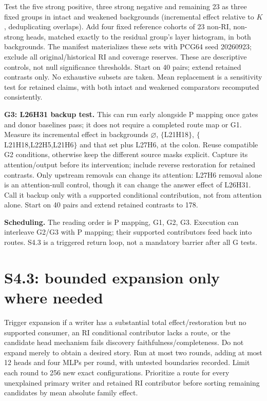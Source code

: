 \documentclass[11pt,a4paper]{article}
\begin{document}
Test the five strong positive, three strong negative and remaining 23 as three
fixed groups in intact and weakened backgrounds (incremental effect relative to
$K$, deduplicating overlaps). Add four fixed reference cohorts of 23 non-RI,
non-strong heads, matched exactly to the residual group's layer histogram, in both
backgrounds. The manifest materializes these sets with PCG64 seed 20260923; exclude
all original/historical RI and coverage reserves. These are descriptive controls,
not null significance thresholds. Start on 40 pairs; extend retained contrasts only.
No exhaustive subsets are taken. Mean replacement is a sensitivity test for retained
claims, with both intact and weakened comparators recomputed consistently.

\textbf{G3: L26H31 backup test.} This can run early alongside P mapping once gates
and donor baselines pass; it does not require a completed route map or G1.
Measure its incremental effect in backgrounds $\varnothing$, $\{$L21H18$\}$,
$\{$L21H18,L22H5,L21H6$\}$ and that set plus L27H6, at the colon. Reuse compatible
G2 conditions, otherwise keep the different source masks explicit. Capture its
attention/output before its intervention; include reverse restoration for retained
contrasts. Only upstream removals can change its attention: L27H6 removal alone is
an attention-null control, though it can change the answer effect of L26H31.
Call it backup only with a supported conditional contribution, not from attention
alone. Start on 40 pairs and extend retained contrasts to 178.

\textbf{Scheduling.} The reading order is P mapping, G1, G2, G3. Execution can
interleave G2/G3 with P mapping; their supported contributors feed back into routes.
S4.3 is a triggered return loop, not a mandatory barrier after all G tests.

\section{S4.3: bounded expansion only where needed}
\label{sec:expansion}
Trigger expansion if a writer has a substantial total effect/restoration but no
supported consumer, an RI conditional contributor lacks a route, or the candidate
head mechanism fails discovery faithfulness/completeness. Do not expand merely to
obtain a desired story. Run at most two rounds, adding at most 12 heads and four MLPs
per round, with untested boundaries recorded.
Limit each round to 256 new exact configurations. Prioritize a route for every
unexplained primary writer and retained RI contributor before sorting remaining
candidates by mean absolute family effect.
\end{document}
